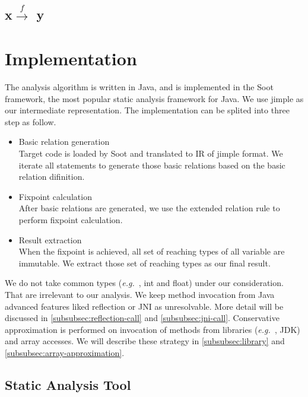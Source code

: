 \documentclass{fac}
\newcommand\eg{\textit{e.g.\ }}
\newcommand{\hflow}{\longrightarrow}
\newcommand{\lhflow}[1]{\stackrel{#1}{\hflow}}
\begin{document}
\subsection{x$\lhflow{f}$ y}

\section{Implementation}\label{sec:implementation}
The analysis algorithm is written in Java, and is implemented in the Soot framework, the most popular static analysis framework for Java. We use jimple as our intermediate representation. The implementation can be splited into three step as follow.
\begin{itemize}
\item Basic relation generation\\
Target code is loaded by Soot and translated to IR of jimple format. We iterate all statements to generate those basic relations based on the basic relation difinition. 
\item Fixpoint calculation\\
After basic relations are generated, we use the extended relation rule to perform fixpoint calculation.
\item Result extraction\\
When the fixpoint is achieved, all set of reaching types of all variable are immutable. We extract those set of reaching types as our final result.
\end{itemize}
We do not take common types (\eg, int and float) under our consideration. That are irrelevant to our analysis. We keep method invocation from Java advanced features liked reflection or JNI as unresolvable. More detail will be discussed in \ref{subsubsec:reflection-call} and \ref{subsubsec:jni-call}. Conservative approximation is performed on invocation of methods from libraries (\eg, JDK) and array accesses. We will describe these strategy in \ref{subsubsec:library} and \ref{subsubsec:array-approximation}.

\subsection{Static Analysis Tool}\label{subsec:static-analysis-tool}
\end{document}
